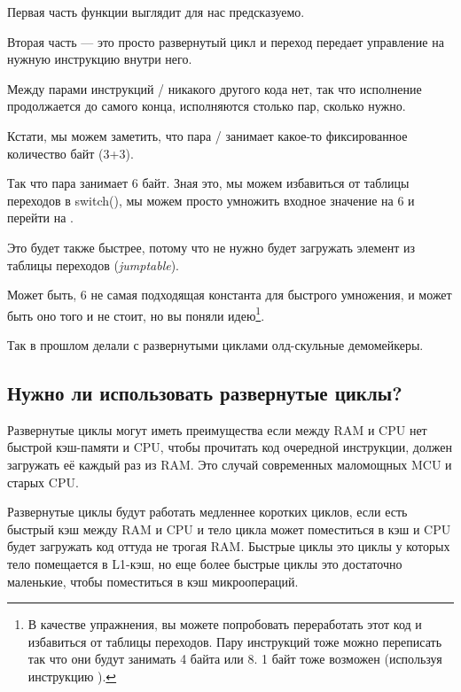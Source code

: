 

Первая часть функции выглядит для нас предсказуемо.

Вторая часть --- это просто развернутый цикл и переход передает управление на нужную инструкцию
внутри него.

Между парами инструкций / никакого другого кода нет, так что исполнение
продолжается до самого конца, исполняются столько пар, сколько нужно.

Кстати, мы можем заметить, что пара / занимает какое-то фиксированное количество
байт (3+3).

Так что пара занимает 6 байт.
Зная это, мы можем избавиться от таблицы переходов в switch(), мы можем просто умножить входное значение
на 6 и перейти на .

Это будет также быстрее, потому что не нужно будет загружать элемент из таблицы переходов (\emph{jumptable}).

Может быть, 6 не самая подходящая константа для быстрого умножения, и может быть оно того и не стоит,
но вы поняли идею\footnote{В качестве упражнения, вы можете попробовать переработать этот код и избавиться
от таблицы переходов.
Пару инструкций тоже можно переписать так что они будут занимать 4 байта или 8.
1 байт тоже возможен (используя инструкцию ).}.

Так в прошлом делали с развернутыми циклами олд-скульные демомейкеры.

\subsection{Нужно ли использовать развернутые циклы?}

Развернутые циклы могут иметь преимущества если между \ac{RAM} и \ac{CPU} нет быстрой кэш-памяти и \ac{CPU},
чтобы прочитать код очередной
инструкции, должен загружать её каждый раз из \ac{RAM}.
Это случай современных маломощных \ac{MCU} и старых \ac{CPU}.

Развернутые циклы будут работать медленнее коротких циклов, если есть быстрый кэш между \ac{RAM} и \ac{CPU} и тело цикла
может поместиться в кэш и CPU будет загружать код оттуда не трогая \ac{RAM}.
Быстрые циклы это циклы у которых тело помещается в L1-кэш, но еще более быстрые циклы это достаточно маленькие,
чтобы поместиться в кэш микроопераций.

